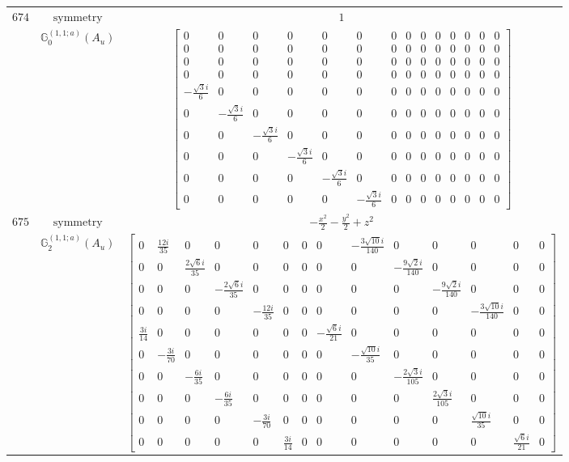 \documentclass[fleqn,8pt,landscape]{jsarticle}
\begin{document}
\begin{longtable}{ccc}
$ 674 $ & $ \text{symmetry} $ & $ 1 $ \\
$  $ & $ \mathbb{G}_{0}^{(1,1;a)}(A_{u}) $ & $ \begin{bmatrix} 0 & 0 & 0 & 0 & 0 & 0 & 0 & 0 & 0 & 0 & 0 & 0 & 0 & 0 \\ 0 & 0 & 0 & 0 & 0 & 0 & 0 & 0 & 0 & 0 & 0 & 0 & 0 & 0 \\ 0 & 0 & 0 & 0 & 0 & 0 & 0 & 0 & 0 & 0 & 0 & 0 & 0 & 0 \\ 0 & 0 & 0 & 0 & 0 & 0 & 0 & 0 & 0 & 0 & 0 & 0 & 0 & 0 \\ - \frac{\sqrt{3} i}{6} & 0 & 0 & 0 & 0 & 0 & 0 & 0 & 0 & 0 & 0 & 0 & 0 & 0 \\ 0 & - \frac{\sqrt{3} i}{6} & 0 & 0 & 0 & 0 & 0 & 0 & 0 & 0 & 0 & 0 & 0 & 0 \\ 0 & 0 & - \frac{\sqrt{3} i}{6} & 0 & 0 & 0 & 0 & 0 & 0 & 0 & 0 & 0 & 0 & 0 \\ 0 & 0 & 0 & - \frac{\sqrt{3} i}{6} & 0 & 0 & 0 & 0 & 0 & 0 & 0 & 0 & 0 & 0 \\ 0 & 0 & 0 & 0 & - \frac{\sqrt{3} i}{6} & 0 & 0 & 0 & 0 & 0 & 0 & 0 & 0 & 0 \\ 0 & 0 & 0 & 0 & 0 & - \frac{\sqrt{3} i}{6} & 0 & 0 & 0 & 0 & 0 & 0 & 0 & 0 \end{bmatrix} $ \\ \hline
$ 675 $ & $ \text{symmetry} $ & $ - \frac{x^{2}}{2} - \frac{y^{2}}{2} + z^{2} $ \\
$  $ & $ \mathbb{G}_{2}^{(1,1;a)}(A_{u}) $ & $ \begin{bmatrix} 0 & \frac{12 i}{35} & 0 & 0 & 0 & 0 & 0 & 0 & - \frac{3 \sqrt{10} i}{140} & 0 & 0 & 0 & 0 & 0 \\ 0 & 0 & \frac{2 \sqrt{6} i}{35} & 0 & 0 & 0 & 0 & 0 & 0 & - \frac{9 \sqrt{2} i}{140} & 0 & 0 & 0 & 0 \\ 0 & 0 & 0 & - \frac{2 \sqrt{6} i}{35} & 0 & 0 & 0 & 0 & 0 & 0 & - \frac{9 \sqrt{2} i}{140} & 0 & 0 & 0 \\ 0 & 0 & 0 & 0 & - \frac{12 i}{35} & 0 & 0 & 0 & 0 & 0 & 0 & - \frac{3 \sqrt{10} i}{140} & 0 & 0 \\ \frac{3 i}{14} & 0 & 0 & 0 & 0 & 0 & 0 & - \frac{\sqrt{6} i}{21} & 0 & 0 & 0 & 0 & 0 & 0 \\ 0 & - \frac{3 i}{70} & 0 & 0 & 0 & 0 & 0 & 0 & - \frac{\sqrt{10} i}{35} & 0 & 0 & 0 & 0 & 0 \\ 0 & 0 & - \frac{6 i}{35} & 0 & 0 & 0 & 0 & 0 & 0 & - \frac{2 \sqrt{3} i}{105} & 0 & 0 & 0 & 0 \\ 0 & 0 & 0 & - \frac{6 i}{35} & 0 & 0 & 0 & 0 & 0 & 0 & \frac{2 \sqrt{3} i}{105} & 0 & 0 & 0 \\ 0 & 0 & 0 & 0 & - \frac{3 i}{70} & 0 & 0 & 0 & 0 & 0 & 0 & \frac{\sqrt{10} i}{35} & 0 & 0 \\ 0 & 0 & 0 & 0 & 0 & \frac{3 i}{14} & 0 & 0 & 0 & 0 & 0 & 0 & \frac{\sqrt{6} i}{21} & 0 \end{bmatrix} $ \\ \hline

\end{longtable}
\end{document}
